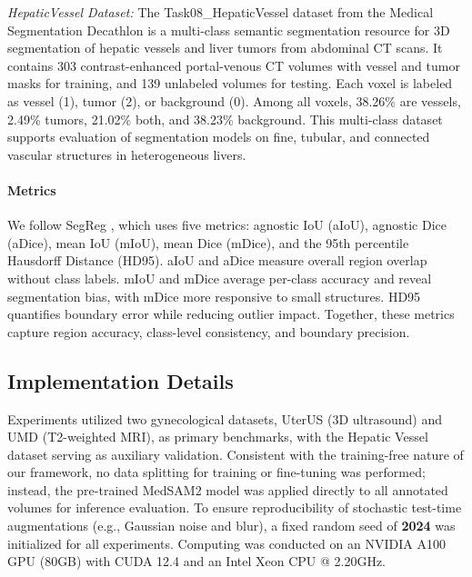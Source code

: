 \documentclass{article}
\begin{document}
\textit{HepaticVessel Dataset: }
The Task08\_HepaticVessel dataset \cite{task08hepatic2019} from the Medical Segmentation Decathlon is a multi-class semantic segmentation resource for 3D segmentation of hepatic vessels and liver tumors from abdominal CT scans. It contains 303 contrast-enhanced portal-venous CT volumes with vessel and tumor masks for training, and 139 unlabeled volumes for testing. Each voxel is labeled as vessel (1), tumor (2), or background (0). Among all voxels, 38.26\% are vessels, 2.49\% tumors, 21.02\% both, and 38.23\% background. This multi-class dataset supports evaluation of segmentation models on fine, tubular, and connected vascular structures in heterogeneous livers.


\paragraph{Metrics}

We follow SegReg \cite{zhang2024segreg}, which uses five metrics: agnostic IoU (aIoU), agnostic Dice (aDice), mean IoU (mIoU), mean Dice (mDice), and the 95th percentile Hausdorff Distance (HD95). aIoU and aDice measure overall region overlap without class labels. mIoU and mDice average per-class accuracy and reveal segmentation bias, with mDice more responsive to small structures. HD95 quantifies boundary error while reducing outlier impact. Together, these metrics capture region accuracy, class-level consistency, and boundary precision.


\subsection{Implementation Details}
Experiments utilized two gynecological datasets, UterUS (3D ultrasound) and UMD (T2-weighted MRI), as primary benchmarks, with the Hepatic Vessel dataset serving as auxiliary validation. Consistent with the training-free nature of our framework, no data splitting for training or fine-tuning was performed; instead, the pre-trained MedSAM2 model was applied directly to all annotated volumes for inference evaluation. To ensure reproducibility of stochastic test-time augmentations (e.g., Gaussian noise and blur), a fixed random seed of \textbf{2024} was initialized for all experiments. Computing was conducted on an NVIDIA A100 GPU (80GB) with CUDA 12.4 and an Intel Xeon CPU @ 2.20GHz.
\end{document}
